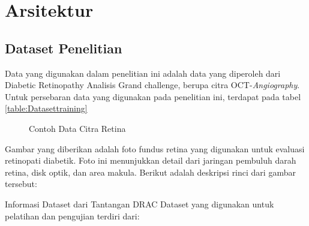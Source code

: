 \section{Arsitektur}
\label{sec:arsitektur}


\subsection{Dataset Penelitian}
\label{subsec:dataset}

Data yang digunakan dalam penelitian ini adalah data yang diperoleh dari Diabetic Retinopathy Analisis Grand challenge, berupa citra OCT-\emph{Angiography}.
Untuk persebaran data yang digunakan pada penelitian ini, terdapat pada tabel \ref{table:Datasettraining}

	\begin{figure}[hbtp]
		\centering
		\caption{Contoh Data Citra Retina}
		\label{fig:sampleDataset}
	\end{figure}
Gambar yang diberikan adalah foto fundus retina yang digunakan untuk evaluasi retinopati diabetik. Foto ini menunjukkan detail dari jaringan pembuluh darah retina, disk optik, dan area makula. Berikut adalah deskripsi rinci dari gambar tersebut:

Informasi Dataset dari Tantangan DRAC
Dataset yang digunakan untuk pelatihan dan pengujian terdiri dari:


